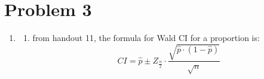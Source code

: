 \documentclass{article}
\begin{document}
\section*{Problem 3}
\begin{enumerate}
\item
\begin{enumerate}
\item from handout 11, the formula for Wald CI for a proportion is: \\
\[
CI = \hat{p} \pm Z_{\frac{\alpha}{2}} \cdot \frac{\sqrt{\hat{p} \cdot (1 - \hat{p})}}{\sqrt{n}}
\]
\end{enumerate}
\end{enumerate}
\end{document}
